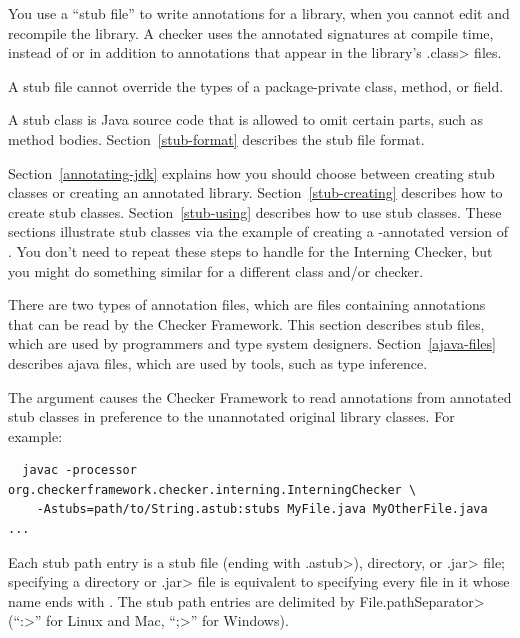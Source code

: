 
You use a ``stub file'' to write annotations
for a library, when you cannot edit and recompile the library.  A
checker uses the annotated signatures at compile time, instead of or in
addition to annotations that appear in the library's \<.class> files.

A stub file cannot override the types of a package-private class, method, or field.

A stub class is Java source code that is allowed to omit certain parts,
such as method bodies.  Section~\ref{stub-format} describes
the stub file format.

Section~\ref{annotating-jdk} explains how you should choose between
creating stub classes or creating an annotated library.
Section~\ref{stub-creating} describes how to create stub classes.
Section~\ref{stub-using} describes how to use stub classes.
These sections illustrate stub classes via the example of creating a -annotated
version of .  You don't need to repeat these steps
to handle  for the Interning Checker,
but you might do something similar for a different class and/or checker.

There are two types of annotation files, which are files containing annotations that
can be read by the Checker Framework.
This section describes stub files, which are used by programmers and
type system designers.
Section~\ref{ajava-files} describes ajava files, which are used by
tools, such as type inference.



The  argument causes the Checker Framework to read
annotations from annotated stub classes in preference to the unannotated
original library classes.  For example:

\begin{myxsmall}
\begin{Verbatim}
  javac -processor org.checkerframework.checker.interning.InterningChecker \
    -Astubs=path/to/String.astub:stubs MyFile.java MyOtherFile.java ...
\end{Verbatim}
\end{myxsmall}

Each stub path entry is a stub file (ending with \<.astub>), directory, or
\<.jar> file; specifying a directory or \<.jar> file is
equivalent to specifying every file in it whose name ends with
.  The stub path entries are delimited by
\<File.pathSeparator> (``\<:>'' for Linux and Mac, ``\<;>'' for Windows).

